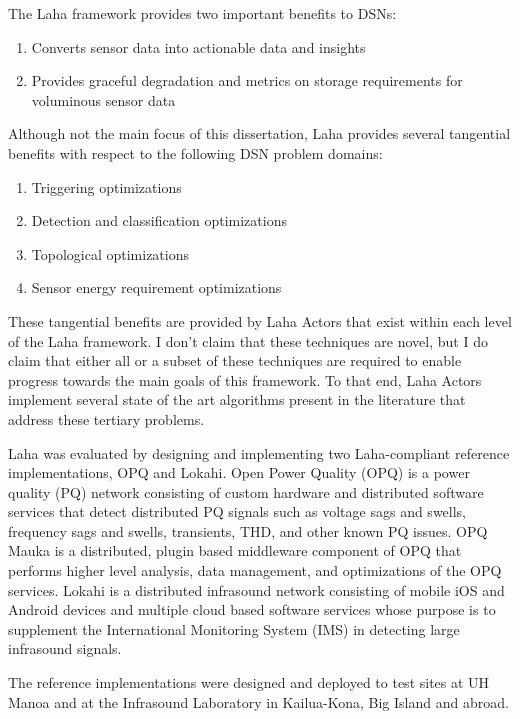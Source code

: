 The Laha framework provides two important benefits to DSNs:

\begin{enumerate}
	\item Converts sensor data into actionable data and insights
	\item Provides graceful degradation and metrics on storage requirements for voluminous sensor data
\end{enumerate}

Although not the main focus of this dissertation, Laha provides several tangential benefits with respect to the following DSN problem domains:

\begin{enumerate}
	\item Triggering optimizations
	\item Detection and classification optimizations
	\item Topological optimizations
	\item Sensor energy requirement optimizations
\end{enumerate}

These tangential benefits are provided by Laha Actors that exist within each level of the Laha framework. I don't claim that these techniques are novel, but I do claim that either all or a subset of these techniques are required to enable progress towards the main goals of this framework. To that end, Laha Actors implement several state of the art algorithms present in the literature that address these tertiary problems.

Laha was evaluated by designing and implementing two Laha-compliant reference implementations, OPQ and Lokahi. Open Power Quality (OPQ) is a power quality (PQ) network consisting of custom hardware and distributed software services that detect distributed PQ signals such as voltage sags and swells, frequency sags and swells, transients, THD, and other known PQ issues. OPQ Mauka is a distributed, plugin based middleware component of OPQ that performs higher level analysis, data management, and optimizations of the OPQ services. Lokahi is a distributed infrasound network consisting of mobile iOS and Android devices and multiple cloud based software services whose purpose is to supplement the International Monitoring System (IMS) in detecting large infrasound signals.

The reference implementations were designed and  deployed to test sites at UH Manoa and at the Infrasound Laboratory in Kailua-Kona, Big Island and abroad.

